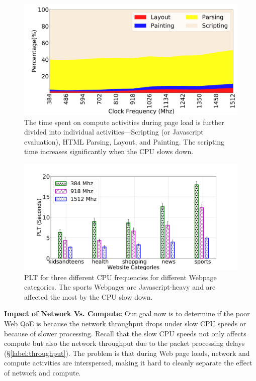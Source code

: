 \begin{figure}[t]
  \centering
  \includegraphics[width=\linewidth]{sections/device-work/plt-pie}
  \caption{The time spent on compute activities during page load is further divided into individual activities---Scripting (or Javascript evaluation), HTML Parsing, Layout, and Painting. The scripting time increases significantly when the CPU slows down.  }
  \label{fig:dissect}
\end{figure}

\begin{figure}[t]
  \centering
  \includegraphics[width=\linewidth]{sections/device-work/sites-effect}
  \caption{PLT for three different CPU frequencies for different Webpage categories. The sports Webpages are Javascript-heavy and are affected the most by the CPU 
  slow down.    }
  \vspace{-0.2in}
  \label{fig:sites-effect}
\end{figure}

{\noindent \bf Impact of Network Vs. Compute:}
Our goal now is to determine if the poor Web QoE is because the network throughput drops under slow CPU speeds or  because of slower processing. Recall that the slow CPU speeds not only affects compute but also the network throughput due to the packet processing delays (\S\ref{label:throughput}). The problem is that during Web page loads, network and compute activities are interspersed, making it hard to cleanly separate the effect of network and compute. 

